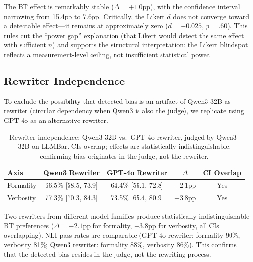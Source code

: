 \documentclass[11pt,a4paper]{article}
\begin{document}
The BT effect is remarkably stable ($\Delta = +1.0$pp), with the confidence interval narrowing from 15.4pp to 7.6pp. Critically, the Likert $d$ does not converge toward a detectable effect---it remains at approximately zero ($d = -0.025$, $p = .60$). This rules out the ``power gap'' explanation (that Likert would detect the same effect with sufficient $n$) and supports the structural interpretation: the Likert blindspot reflects a measurement-level ceiling, not insufficient statistical power.

\subsection{Rewriter Independence}
\label{sec:rewriter}

To exclude the possibility that detected bias is an artifact of Qwen3-32B as rewriter (circular dependency when Qwen3 is also the judge), we replicate using GPT-4o as an alternative rewriter.

\begin{table}[t]
\centering
\small
\caption{Rewriter independence: Qwen3-32B vs.\ GPT-4o rewriter, judged by Qwen3-32B on LLMBar. CIs overlap; effects are statistically indistinguishable, confirming bias originates in the judge, not the rewriter.}
\label{tab:rewriter}
\begin{tabular}{lcccc}
\toprule
\textbf{Axis} & \textbf{Qwen3 Rewriter} & \textbf{GPT-4o Rewriter} & $\Delta$ & \textbf{CI Overlap} \\
\midrule
Formality  & 66.5\% [58.5, 73.9] & 64.4\% [56.1, 72.8] & $-$2.1pp & Yes \\
Verbosity  & 77.3\% [70.3, 84.3] & 73.5\% [65.4, 80.9] & $-$3.8pp & Yes \\
\bottomrule
\end{tabular}
\end{table}

Two rewriters from different model families produce statistically indistinguishable BT preferences ($\Delta = -2.1$pp for formality, $-3.8$pp for verbosity, all CIs overlapping). NLI pass rates are comparable (GPT-4o rewriter: formality 90\%, verbosity 81\%; Qwen3 rewriter: formality 88\%, verbosity 86\%). This confirms that the detected bias resides in the judge, not the rewriting process.

\end{document}
